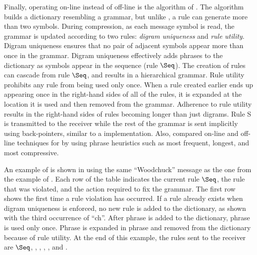Finally, operating on-line instead of off-line is the \sequitur 
algorithm of \citet{nw97:cj}.  The \sequitur algorithm 
builds a dictionary resembling a grammar, but unlike \repair,
a rule can generate more than two symbols.  During 
compression, as each message symbol is read, the grammar is 
updated according to two rules:  {\emph {digram uniqueness}} and 
{\emph {rule utility}}.  Digram uniqueness ensures that no pair
of adjacent symbols appear more than once in the grammar.
Digram uniqueness effectively adds phrases to the dictionary 
as symbols appear in the sequence (rule $\Seq$).  The creation
of rules can cascade from rule $\Seq$, and results in a 
hierarchical grammar.  Rule utility prohibits any rule
from being used only once.  When a rule created earlier ends
up appearing once in the right-hand sides of all of the rules,
it is expanded at the location it is
used and then removed from the grammar.
Adherence to rule utility results in the right-hand sides of
rules becoming longer than just digrams.  Rule S is transmitted
to the receiver while the rest of the grammar is sent implicitly
using back-pointers, similar to a \lza implementation.  Also, 
\citet{nw00:procieee} compared on-line and off-line techniques for 
\sequitur by using phrase heuristics such as most frequent, longest, 
and most compressive.

An example of \sequitur is shown in  
using the same ``Woodchuck'' message as the one from the
example of .
Each row of the table indicates the current rule $\Seq$, the \sequitur
rule that was violated, and the action required to fix the grammar.
The first row shows the first time a rule violation has occurred.
If a rule already 
exists when digram uniqueness is enforced, 
no new rule is added to the dictionary, as shown with the third
occurrence of ``ch''.  After phrase 
 is added to the dictionary, phrase  is used only once.
Phrase  is expanded in phrase  and removed from the
dictionary because of rule utility.  At the end of this example,
the rules sent to the receiver are $\Seq$, , , 
, , and .

\newcommand{\digram}{digram uniqueness}
\newcommand{\utility}[1]{rule \tc{#1}}
\newcommand{\addseq}[2]{Add \tc{#1} $\rightarrow$ #2}
\newcommand{\removeseq}[1]{Remove rule \tc{#1}}
\newcommand{\useseq}[1]{Use rule \tc{#1}}

